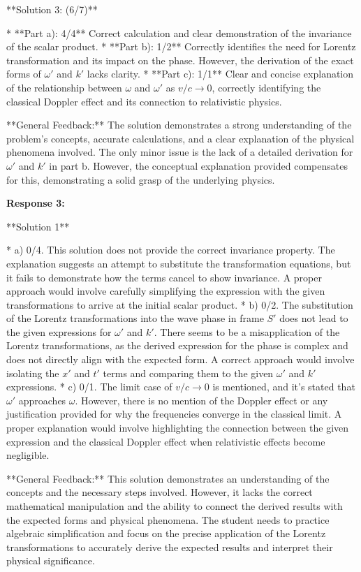 \documentclass[a4paper,11pt]{article}
\begin{document}
**Solution 3: (6/7)**

*   **Part a): 4/4** Correct calculation and clear demonstration of the invariance of the scalar product.
*   **Part b): 1/2** Correctly identifies the need for Lorentz transformation and its impact on the phase. However, the derivation of the exact forms of \(\omega'\) and \(k'\) lacks clarity.
*   **Part c): 1/1** Clear and concise explanation of the relationship between \( \omega \) and \( \omega' \) as \( v/c \rightarrow 0 \), correctly identifying the classical Doppler effect and its connection to relativistic physics.

**General Feedback:** The solution demonstrates a strong understanding of the problem's concepts, accurate calculations, and a clear explanation of the physical phenomena involved. The only minor issue is the lack of a detailed derivation for \(\omega'\) and \(k'\) in part b. However, the conceptual explanation provided compensates for this, demonstrating a solid grasp of the underlying physics.

\bigskip    
\textbf{Response 3:}

**Solution 1**

* a) 0/4. This solution does not provide the correct invariance property. The explanation suggests an attempt to substitute the transformation equations, but it fails to demonstrate how the terms cancel to show invariance. A proper approach would involve carefully simplifying the expression with the given transformations to arrive at the initial scalar product.
* b) 0/2. The substitution of the Lorentz transformations into the wave phase in frame \( S' \) does not lead to the given expressions for \( \omega' \) and \( k' \). There seems to be a misapplication of the Lorentz transformations, as the derived expression for the phase is complex and does not directly align with the expected form. A correct approach would involve isolating the \( x' \) and \( t' \) terms and comparing them to the given \( \omega' \) and \( k' \) expressions.
* c) 0/1. The limit case of \( v/c \rightarrow 0 \) is mentioned, and it's stated that \( \omega' \) approaches \( \omega \). However, there is no mention of the Doppler effect or any justification provided for why the frequencies converge in the classical limit. A proper explanation would involve highlighting the connection between the given expression and the classical Doppler effect when relativistic effects become negligible.

**General Feedback:** This solution demonstrates an understanding of the concepts and the necessary steps involved. However, it lacks the correct mathematical manipulation and the ability to connect the derived results with the expected forms and physical phenomena. The student needs to practice algebraic simplification and focus on the precise application of the Lorentz transformations to accurately derive the expected results and interpret their physical significance.
\end{document}
